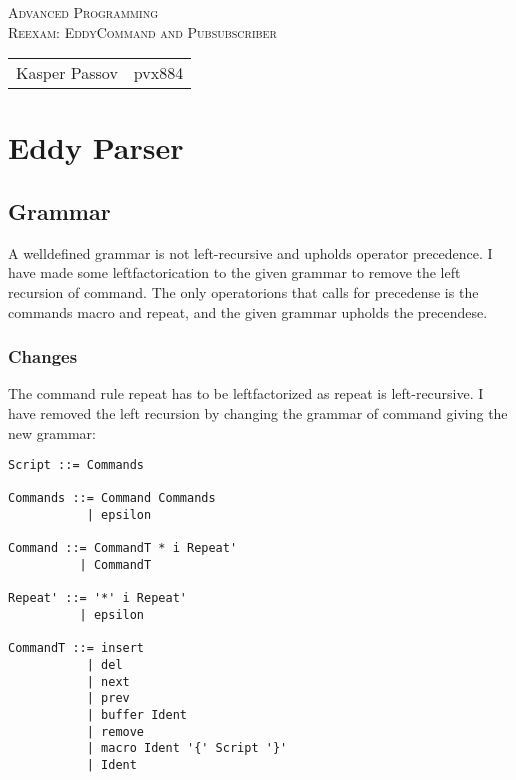 \documentclass{article}
\begin{document}
\begin{titlepage}
\begin{center}
\textsc{\Large Advanced Programming}\\[0.5cm]
\textsc{Reexam: EddyCommand and Pubsubscriber}\\[0.5cm]
\vspace{2 cm}
\begin{tabular}{ll}
Kasper Passov & pvx884\\
\end{tabular}
\end{center}
\vspace{5 cm}
\newpage
\tableofcontents
\end{titlepage}

\section{Eddy Parser}

\subsection{Grammar}

A welldefined grammar is not left-recursive and upholds
operator precedence. 
I have made some leftfactorication to the given grammar to
remove the left recursion of command. The only operatorions that
calls for precedense is the commands macro and repeat, and the given 
grammar upholds the precendese.    

\subsubsection{Changes}

The command rule repeat has to be leftfactorized as 
repeat is left-recursive.
I have removed the left recursion by changing the grammar
of command giving the new grammar:

\begin{verbatim}
Script ::= Commands

Commands ::= Command Commands
           | epsilon

Command ::= CommandT * i Repeat'
          | CommandT

Repeat' ::= '*' i Repeat'
          | epsilon  
       
CommandT ::= insert
           | del 
           | next
           | prev
           | buffer Ident 
           | remove
           | macro Ident '{' Script '}'
           | Ident
\end{verbatim}
\end{document}
